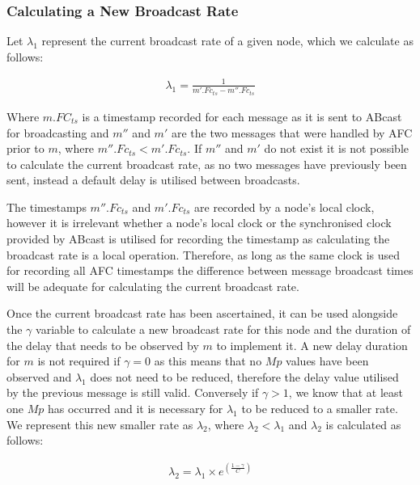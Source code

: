     \subsubsection*{Calculating a New Broadcast Rate}
    Let $\lambda_1$ represent the current broadcast rate of a given node, which we calculate as follows:

    \begin{equation*}
		     \begin{aligned}
		         \lambda_1 = \frac{1}{m'.Fc_{ts} - m''.Fc_{ts}}
		     \end{aligned}
    \end{equation*} 
    
    Where $m.FC_{ts}$ is a timestamp recorded for each message as it is sent to \textsf{ABcast} for broadcasting and $m''$ and $m'$ are the two messages that were handled by AFC prior to $m$, where $m''.Fc_{ts} < m'.Fc_{ts}$.  If $m''$ and $m'$ do not exist it is not possible to calculate the current broadcast rate, as no two messages have previously been sent, instead a default delay is utilised between broadcasts.  
    
    The timestamps $m''.Fc_{ts}$ and $m'.Fc_{ts}$ are recorded by a node's local clock, however it is irrelevant whether a node's local clock or the  synchronised clock provided by \textsf{ABcast} is utilised for recording the timestamp as calculating the broadcast rate is a local operation.  Therefore, as long as the same clock is used for recording all AFC timestamps the difference between message broadcast times will be adequate for calculating the current broadcast rate.   
    
    Once the current broadcast rate has been ascertained, it can be used alongside the $\gamma$ variable to calculate a new broadcast rate for this node and the duration of the delay that needs to be observed by $m$ to implement it.  A new delay duration for $m$ is not required if $\gamma = 0$ as this means that no $Mp$ values have been observed and $\lambda_1$ does not need to be reduced, therefore the delay value utilised by the previous message is still valid.  Conversely if $\gamma > 1$, we know that at least one $Mp$ has occurred and it is necessary for $\lambda_1$ to be reduced to a smaller rate.  We represent this new smaller rate as $\lambda_2$, where $\lambda_2 < \lambda_1$ and $\lambda_2$ is calculated as follows:
    
      \begin{equation*}
		     \begin{aligned}
		         \lambda_2 = \lambda_1 \times e ^{ ({\frac{1-\gamma}{C}})}
		     \end{aligned}
    \end{equation*} 
    
